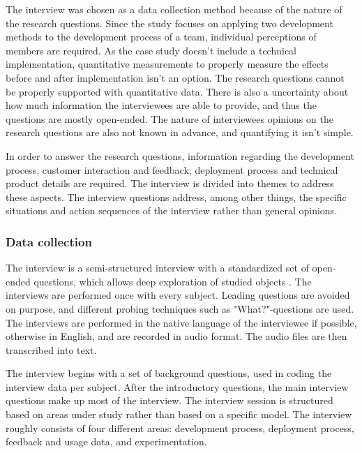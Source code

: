 \documentclass[english]{tktltiki2}
\theoremstyle{definition}
\theoremstyle{remark}
\begin{document}
The interview was chosen as a data collection method because of the nature of the research questions. Since the study focuses on applying two development methods to the development process of a team, individual perceptions of members are required. As the case study doesn't include a technical implementation, quantitative measurements to properly measure the effects before and after implementation isn't an option. The research questions cannot be properly supported with quantitative data. There is also a uncertainty about how much information the interviewees are able to provide, and thus the questions are mostly open-ended. The nature of interviewees opinions on the research questions are also not known in advance, and quantifying it isn't simple. 

In order to answer the research questions, information regarding the development process, customer interaction and feedback, deployment process and technical product details are required. The interview is divided into themes to address these aspects. The interview questions address, among other things, the specific situations and action sequences of the interview rather than general opinions. 

\subsubsection{Data collection}
The interview is a semi-structured interview with a standardized set of open-ended questions, which allows deep exploration of studied objects \cite{runeson2009guidelines}. The interviews are performed once with every subject. Leading questions are avoided on purpose, and different probing techniques such as "What?"-questions are used. The interviews are performed in the native language of the interviewee if possible, otherwise in English, and are recorded in audio format. The audio files are then transcribed into text.

The interview begins with a set of background questions, used in coding the interview data per subject. After the introductory questions, the main interview questions make up most of the interview. The interview session is structured based on areas under study rather than based on a specific model. The interview roughly consists of four different areas: development process, deployment process, feedback and usage data, and experimentation.
\end{document}
